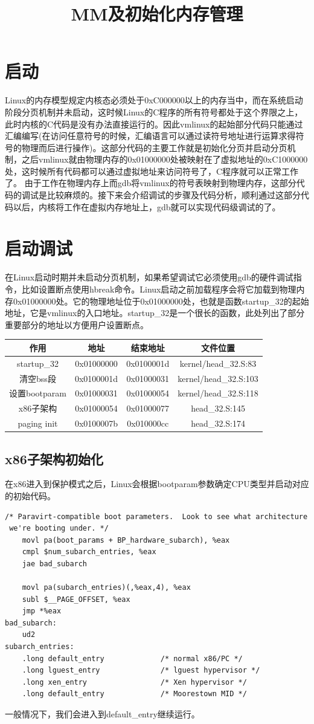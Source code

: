 \documentclass[b5paper,9pt,twoside,openany]{article}
\begin{document}
\title{MM及初始化内存管理}
\section{启动}
Linux的内存模型规定内核态必须处于0xC000000以上的内存当中，而在系统启动阶段分页机制并未启动，这时候Linux的C程序的所有符号都处于这个界限之上，此时内核的C代码是没有办法直接运行的。因此vmlinux的起始部分代码只能通过汇编编写(在访问任意符号的时候，汇编语言可以通过读符号地址进行运算求得符号的物理而后进行操作)。这部分代码的主要工作就是初始化分页并启动分页机制，之后vmlinux就由物理内存的0x01000000处被映射在了虚拟地址的0xC1000000处，这时候所有代码都可以通过虚拟地址来访问符号了，C程序就可以正常工作了。
由于工作在物理内存上而gdb将vmlinux的符号表映射到物理内存，这部分代码的调试是比较麻烦的。接下来会介绍调试的步骤及代码分析，顺利通过这部分代码以后，内核将工作在虚拟内存地址上，gdb就可以实现代码级调试的了。

\section{启动调试}
在Linux启动时期并未启动分页机制，如果希望调试它必须使用gdb的硬件调试指令，比如设置断点使用hbreak命令。Linux启动之前加载程序会将它加载到物理内存0x01000000处。它的物理地址位于0x01000000处，也就是函数startup\_32的起始地址，它是vmlinux的入口地址。startup\_32是一个很长的函数，此处列出了部分重要部分的地址以方便用户设置断点。

\begin{tabular}{|c|c|c|c|}
\hline
作用  & 地址 & 结束地址 & 文件位置 \\
\hline
startup\_32 & 0x01000000 & 0x0100001d & kernel/head\_32.S:83 \\
\hline
清空bss段 & 0x0100001d & 0x01000031 & kernel/head\_32.S:103 \\
\hline
设置bootparam & 0x01000031 & 0x01000054 & kernel/head\_32.S:118 \\
\hline
x86子架构 & 0x01000054 & 0x01000077 & head\_32.S:145 \\
\hline
paging init & 0x0100007b & 0x010000cc & head\_32.S:174 \\
\hline
\end{tabular}

\subsection{x86子架构初始化}
在x86进入到保护模式之后，Linux会根据bootparam参数确定CPU类型并启动对应的初始代码。
\begin{lstlisting}
/* Paravirt-compatible boot parameters.  Look to see what architecture
 we're booting under. */
    movl pa(boot_params + BP_hardware_subarch), %eax
    cmpl $num_subarch_entries, %eax
    jae bad_subarch

    movl pa(subarch_entries)(,%eax,4), %eax
    subl $__PAGE_OFFSET, %eax
    jmp *%eax
bad_subarch:
    ud2
subarch_entries:
    .long default_entry             /* normal x86/PC */
    .long lguest_entry              /* lguest hypervisor */
    .long xen_entry                 /* Xen hypervisor */
    .long default_entry             /* Moorestown MID */
\end{lstlisting}
一般情况下，我们会进入到default\_entry继续运行。
\end{document}
